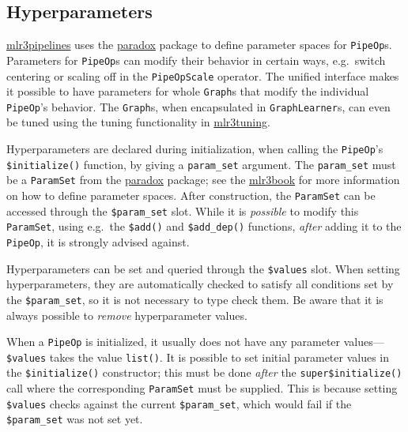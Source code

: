 \documentclass[
  11pt,
  parskip=half,
  DIV=calc,
  BCOR=10mm,
  x11names]{scrbook}
\begin{document}
\hypertarget{ext-pipe-hyperpars}{%
\subsection{Hyperparameters}\label{ext-pipe-hyperpars}}

\href{https://mlr3pipelines.mlr-org.com}{mlr3pipelines} uses the \href{https://paradox.mlr-org.com}{paradox} package to define parameter spaces for \texttt{PipeOp}s.
Parameters for \texttt{PipeOp}s can modify their behavior in certain ways, e.g.~switch centering or scaling off in the \texttt{PipeOpScale} operator.
The unified interface makes it possible to have parameters for whole \texttt{Graph}s that modify the individual \texttt{PipeOp}'s behavior.
The \texttt{Graph}s, when encapsulated in \texttt{GraphLearner}s, can even be tuned using the tuning functionality in \href{https://mlr3tuning.mlr-org.com}{mlr3tuning}.

Hyperparameters are declared during initialization, when calling the \texttt{PipeOp}'s \texttt{\$initialize()} function, by giving a \texttt{param\_set} argument.
The \texttt{param\_set} must be a \texttt{ParamSet} from the \href{https://paradox.mlr-org.com}{paradox} package; see the \href{https://mlr3book.mlr-org.com}{mlr3book} for more information on how to define parameter spaces.
After construction, the \texttt{ParamSet} can be accessed through the \texttt{\$param\_set} slot.
While it is \emph{possible} to modify this \texttt{ParamSet}, using e.g.~the \texttt{\$add()} and \texttt{\$add\_dep()} functions, \emph{after} adding it to the \texttt{PipeOp}, it is strongly advised against.

Hyperparameters can be set and queried through the \texttt{\$values} slot.
When setting hyperparameters, they are automatically checked to satisfy all conditions set by the \texttt{\$param\_set}, so it is not necessary to type check them.
Be aware that it is always possible to \emph{remove} hyperparameter values.

When a \texttt{PipeOp} is initialized, it usually does not have any parameter values---\texttt{\$values} takes the value \texttt{list()}.
It is possible to set initial parameter values in the \texttt{\$initialize()} constructor; this must be done \emph{after} the \texttt{super\$initialize()} call where the corresponding \texttt{ParamSet} must be supplied.
This is because setting \texttt{\$values} checks against the current \texttt{\$param\_set}, which would fail if the \texttt{\$param\_set} was not set yet.
\end{document}
